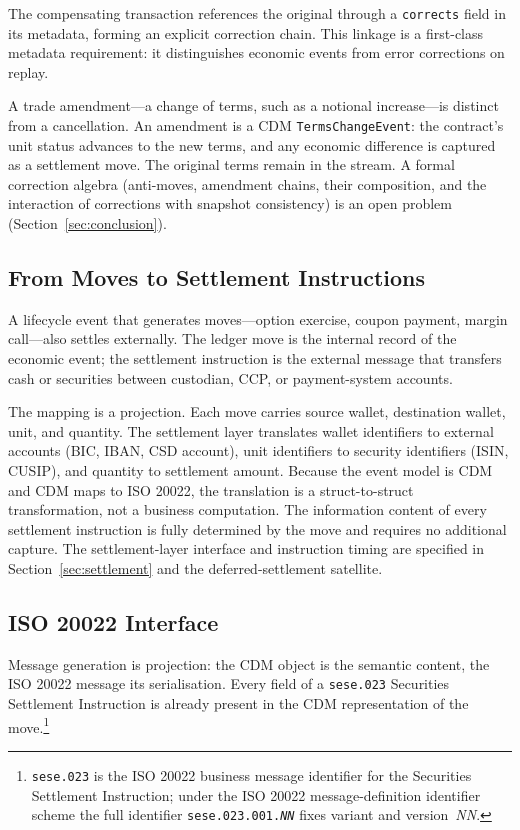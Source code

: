 The compensating transaction references the original through a \texttt{corrects} field in its metadata, forming an explicit correction chain. This linkage is a first-class metadata requirement: it distinguishes economic events from error corrections on replay.

A trade amendment---a change of terms, such as a notional increase---is distinct from a cancellation. An amendment is a CDM \texttt{TermsChangeEvent}: the contract's unit status advances to the new terms, and any economic difference is captured as a settlement move. The original terms remain in the stream. A formal correction algebra (anti-moves, amendment chains, their composition, and the interaction of corrections with snapshot consistency) is an open problem (Section~\ref{sec:conclusion}).

\subsection{From Moves to Settlement Instructions}
\label{sec:sec11-settlement}

A lifecycle event that generates moves---option exercise, coupon payment, margin call---also settles externally. The ledger move is the internal record of the economic event; the settlement instruction is the external message that transfers cash or securities between custodian, CCP, or payment-system accounts.

The mapping is a projection. Each move carries source wallet, destination wallet, unit, and quantity. The settlement layer translates wallet identifiers to external accounts (BIC, IBAN, CSD account), unit identifiers to security identifiers (ISIN, CUSIP), and quantity to settlement amount. Because the event model is CDM and CDM maps to ISO 20022, the translation is a struct-to-struct transformation, not a business computation. The information content of every settlement instruction is fully determined by the move and requires no additional capture. The settlement-layer interface and instruction timing are specified in Section~\ref{sec:settlement} and the deferred-settlement satellite.

\subsection{ISO 20022 Interface}
\label{sec:sec11-iso}

Message generation is projection: the CDM object is the semantic content, the ISO 20022 message its serialisation. Every field of a \texttt{sese.023} Securities Settlement Instruction is already present in the CDM representation of the move.\footnote{\texttt{sese.023} is the ISO 20022 business message identifier for the Securities Settlement Instruction; under the ISO 20022 message-definition identifier scheme the full identifier \texttt{sese.023.001.\textit{NN}} fixes variant and version~\textit{NN}.}

